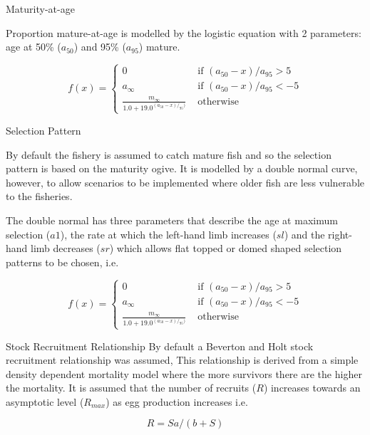 \documentclass[preprint,12pt]{elsarticle}
\begin{document}
Maturity-at-age

Proportion mature-at-age is modelled by the logistic equation with 2 parameters: age at 50\% ($a_{50}$) and 95\% ($a_{95}$) mature.

\begin{equation}
f(x) = \left\{ \begin{array}{ll}
			0                                 &\mbox{ if $(a_{50}-x)/a_{95} >  5$} \\
			a_{\infty}                        &\mbox{ if $(a_{50}-x)/a_{95} < -5$} \\
			\frac{m_{\infty}}{1.0+19.0^{(a_{50}-x)/_{95})}} &\mbox{ otherwise}
		\end{array}
       \right.
\end{equation}

Selection Pattern

By default the fishery is assumed to catch mature fish and so the selection pattern is based on the maturity ogive. It is modelled by a double normal curve, however, to allow scenarios to be implemented where older fish are less vulnerable to the fisheries.    

The double normal has three parameters that describe the age at maximum selection ($a1$), the rate at which the left-hand  limb increases ($sl$) and the right-hand limb decreases ($sr$) which allows flat topped or domed shaped selection patterns to be chosen, i.e.
         
\begin{equation}
f(x) = \left\{ \begin{array}{ll}
			0                                 &\mbox{ if $(a_{50}-x)/a_{95} >  5$} \\
			a_\infty                        &\mbox{ if $(a_{50}-x)/a_{95} < -5$} \\
			\frac{m_\infty}{1.0+19.0^{(a_{50}-x)/_{95})}} &\mbox{ otherwise}
		\end{array}
       \right.
\end{equation}

Stock Recruitment Relationship
By default a Beverton and Holt stock recruitment relationship \cite{beverton1993dynamics} was assumed, This relationship is derived from a simple density dependent mortality model where the more survivors there are the higher the mortality. It is assumed that the number of recruits ($R$) increases towards an asymptotic level ($R_{max}$) as egg production increases i.e.  
 
 \begin{equation} R=Sa/(b+S) \end{equation} 
\end{document}

